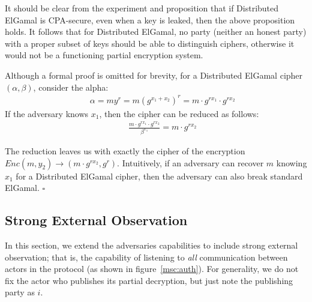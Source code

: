 It should be clear from the experiment and proposition that if Distributed ElGamal is CPA-secure, even when a key is leaked, then the above proposition holds. It follows that for Distributed ElGamal, no party (neither an honest party) with a proper subset of keys should be able to distinguish ciphers, otherwise it would not be a functioning partial encryption system.


Although a formal proof is omitted for brevity, for a Distributed ElGamal cipher $(\alpha, \beta)$, consider the alpha:
{\setlength{\mathindent}{0cm}
\begin{align*}
&&    \alpha = m  y^r = m \left(g^{x_1 + x_2}\right)^r = m \cdot g^{rx_1} \cdot g^{rx_2}
\end{align*}}
If the adversary knows $x_1$, then the cipher can be reduced as follows:
{\setlength{\mathindent}{0cm}
\begin{align*}
&&  \frac{m \cdot g^{rx_1} \cdot g^{rx_2}}{\beta^{x_1}} = m \cdot g^{rx_2}
\end{align*}}

The reduction leaves us with exactly the cipher of the encryption $Enc(m,y_2) \rightarrow (m \cdot g^{rx_2}, g^r)$. Intuitively, if an adversary can recover $m$ knowing $x_1$ for a Distributed ElGamal cipher, then the adversary can also break standard ElGamal. \hfill $\square$


\subsection{Strong External Observation}
In this section, we extend the adversaries capabilities to include strong external observation; that is, the capability of listening to \textit{all} communication between actors in the protocol (as shown in figure~\ref{msc:auth}). For generality, we do not fix the actor who publishes its partial decryption, but just note the publishing party as $i$.

